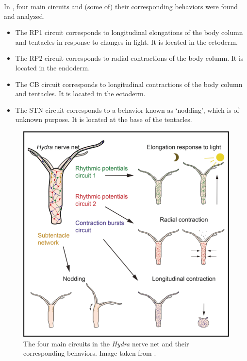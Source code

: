 \documentclass{article}
\begin{document}
In \cite{hydra}, four main circuits and (some of) their corresponding behaviors were found and analyzed.
\begin{itemize}
    \item The RP1 circuit corresponds to longitudinal elongations of the body column and tentacles in response to changes in light. It is located in the ectoderm.
    \item The RP2 circuit corresponds to radial contractions of the body column. It is located in the endoderm.
    \item The CB circuit corresponds to longitudinal contractions of the body column and tentacles. It is located in the ectoderm.
    \item The STN circuit corresponds to a behavior known as `nodding', which is of unknown purpose. It is located at the base of the tentacles.
\end{itemize}
\begin{figure}[!htb]
    \centering
    \includegraphics[scale=0.5]{old/hydra_movements.png}
    \caption{The four main circuits in the \textit{Hydra} nerve net and their corresponding behaviors. Image taken from \cite{hydra}.}
    \label{fig:movements}
\end{figure}
\end{document}
